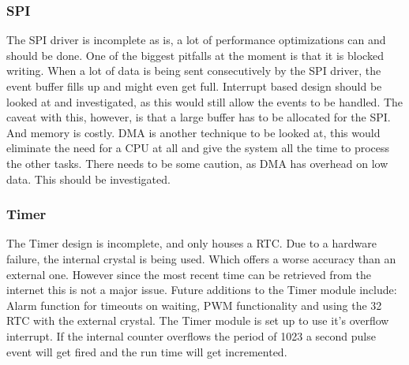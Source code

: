 \subsubsection{SPI}
The SPI driver is incomplete as is, a lot of performance optimizations can and should be done. One of the biggest pitfalls at the moment is that it is blocked writing. When a lot of data is being sent consecutively by the SPI driver, the event buffer fills up and might even get full. Interrupt based design should be looked at and investigated, as this would still allow the events to be handled. The caveat with this, however, is that a large buffer has to be allocated for the SPI. And memory is costly. DMA is another technique to be looked at, this would eliminate the need for a CPU at all and give the system all the time to process the other tasks. There needs to be some caution, as DMA has overhead on low data. This should be investigated.
\subsubsection{Timer}
The Timer design is incomplete, and only houses a RTC. Due to a hardware failure, the internal crystal is being used. Which offers a worse accuracy than an external one. However since the most recent time can be retrieved from the internet this is not a major issue. Future additions to the Timer module include: Alarm function for timeouts on waiting, PWM functionality and using the 32 RTC with the external crystal. The Timer module is set up to use it's overflow interrupt. If the internal counter overflows the period of 1023 a second pulse event will get fired and the run time will get incremented.
